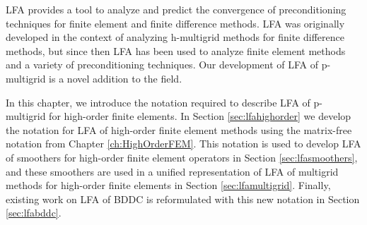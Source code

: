LFA provides a tool to analyze and predict the convergence of preconditioning techniques for finite element and finite difference methods.
LFA \cite{brandt1977multi} was originally developed in the context of analyzing h-multigrid methods for finite difference methods, but since then LFA has been used to analyze finite element methods and a variety of preconditioning techniques.
Our development of LFA of p-multigrid is a novel addition to the field.

In this chapter, we introduce the notation required to describe LFA of p-multigrid for high-order finite elements.
In Section \ref{sec:lfahighorder} we develop the notation for LFA of high-order finite element methods using the matrix-free notation from Chapter \ref{ch:HighOrderFEM}.
This notation is used to develop LFA of smoothers for high-order finite element operators in Section \ref{sec:lfasmoothers}, and these smoothers are used in a unified representation of LFA of multigrid methods for high-order finite elements in Section \ref{sec:lfamultigrid}.
Finally, existing work on LFA of BDDC is reformulated with this new notation in Section \ref{sec:lfabddc}.
